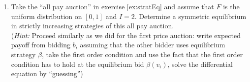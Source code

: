 \documentclass[a4paper,12pt]{article}
\begin{document}
\begin{enumerate}[resume]
\item\label{ex:allPay} Take the ``all pay auction'' in exercise \ref{ex:stratEq} and assume that $F$ is the uniform distribution on $[0,1]$ and $I=2$. Determine a symmetric equilibrium in strictly increasing strategies of this all pay auction. \\
  (\emph{Hint: }Proceed similarly as we did for the first price auction: write expected payoff from bidding $b_i$ assuming that the other bidder uses equilibrium strategy $\beta$, take the first order condition and use the fact that the first order condition has to hold at the equilibrium bid $\beta(v_i)$, solve the differential equation by ``guessing'')

\end{enumerate}
\end{document}
